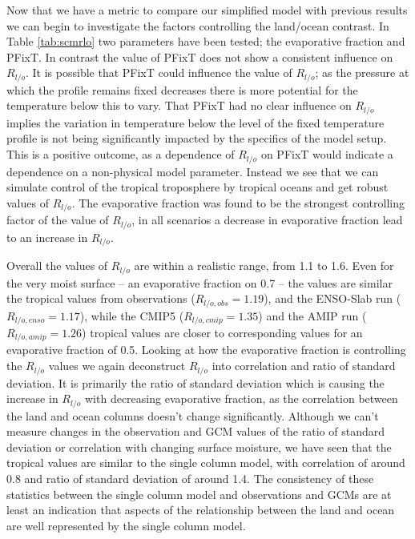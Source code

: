 Now that we have a metric to compare our simplified model with previous results 
we can begin to investigate the factors controlling the land/ocean contrast. In 
Table \ref{tab:scmrlo} two parameters have been tested; the evaporative fraction 
and PFixT. In contrast the value of PFixT does not show a consistent influence 
on $R_{l/o}$. It is possible that PFixT could influence the value of $R_{l/o}$; 
as the pressure at which the profile remains fixed decreases there is more 
potential for the temperature below this to vary.  That PFixT had no clear 
influence on $R_{l/o}$ implies the variation in temperature below the level of 
the fixed temperature profile is not being significantly impacted by the 
specifics of the model setup.  This is a positive outcome, as a dependence of 
$R_{l/o}$ on PFixT would indicate a dependence on a non-physical model 
parameter. Instead we see that we can simulate control of the tropical 
troposphere by tropical oceans and get robust values of $R_{l/o}$.
The evaporative fraction was found to be the strongest controlling factor of the 
value of $R_{l/o}$, in all scenarios a decrease in evaporative fraction lead to 
an increase in $R_{l/o}$.  


Overall the values of $R_{l/o}$ are within a realistic range, from 1.1 to 1.6.
Even for the very moist surface -- an evaporative fraction on 0.7 -- the values 
are similar the tropical values from observations ($R_{l/o, obs} =1.19$), and 
the ENSO-Slab run ($R_{l/o, enso} =1.17$), while the CMIP5 ($R_{l/o,cmip} 
=1.35$) and the AMIP run ($R_{l/o, amip} =1.26$) tropical values are closer to 
corresponding values for an evaporative fraction of 0.5. Looking at how the 
evaporative fraction is controlling the $R_{l/o}$ values we again deconstruct 
$R_{l/o}$ into correlation and ratio of standard deviation. It is primarily the 
ratio of standard deviation which is causing the increase in $R_{l/o}$ with 
decreasing evaporative fraction, as the correlation between the land and ocean 
columns doesn't change significantly.  Although we can't measure changes in the 
observation and GCM values of the ratio of standard deviation or correlation 
with changing surface moisture, we have seen that the tropical values are 
similar to the single column model, with correlation of around 0.8 and ratio of 
standard deviation of around 1.4.  The consistency of these statistics between 
the single column model and observations and GCMs are at least an indication 
that aspects of the relationship between the land and ocean are well represented 
by the single column model. 


